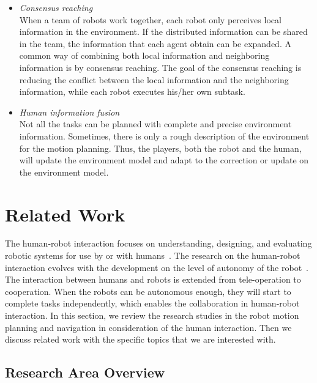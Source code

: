 \documentclass[phd]{byuprop}
\begin{document}
\begin{itemize}
\item {\em Consensus reaching} \\
When a team of robots work together, each robot only perceives local information in the environment.
If the distributed information can be shared in the team, the information that each agent obtain can be expanded.
A common way of combining both local information and neighboring information is by consensus reaching.
The goal of the consensus reaching is reducing the conflict between the local information and the neighboring information, while each robot executes his/her own subtask.

\item {\em Human information fusion} \\
Not all the tasks can be planned with complete and precise environment information.
Sometimes, there is only a rough description of the environment for the motion planning.
Thus, the players, both the robot and the human, will update the environment model and adapt to the correction or update on the environment model.

\end{itemize}

\section{Related Work}

The human-robot interaction focuses on understanding, designing, and evaluating robotic systems for use by or with humans~\cite{goodrich2007human}.
The research on the human-robot interaction evolves with the development on the level of autonomy of the robot~\cite{goodrich2007human}.
The interaction between humans and robots is extended from tele-operation to cooperation.
When the robots can be autonomous enough, they will start to complete tasks independently,
which enables the collaboration in human-robot interaction.
In this section, we review the research studies in the robot motion planning and navigation in consideration of the human interaction.
Then we discuss related work with the specific topics that we are interested with.

\subsection{Research Area Overview}
\end{document}

